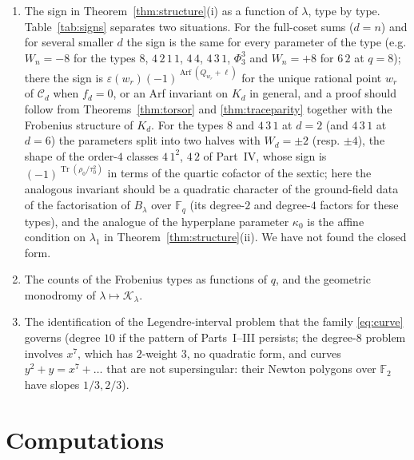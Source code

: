 \documentclass[12pt,a4paper]{amsart}
\theoremstyle{definition}
\newcommand{\F}{\mathbb{F}}
\newcommand{\Tr}{\operatorname{Tr}}
\newcommand{\Arf}{\operatorname{Arf}}
\newcommand{\eps}{\varepsilon}
\newcommand{\Kk}{\mathcal{K}}
\newcommand{\Cc}{\mathcal{C}}
\newcommand{\Fq}{\F_{q}}
\begin{document}
\begin{enumerate}[leftmargin=2em]
\item The sign in Theorem~\ref{thm:structure}(i) as a function of $\lambda$, type by type. Table~\ref{tab:signs} separates two situations. For the full-coset sums ($d=n$) and for several smaller $d$ the sign is the same for every parameter of the type (e.g. $W_n=-8$ for the types $8$, $4\,2\,1\,1$, $4\,4$, $4\,3\,1$, $\Phi_3^3$ and $W_n=+8$ for $6\,2$ at $q=8$); there the sign is $\eps(w_r)(-1)^{\Arf(Q_{w_r}+\ell)}$ for the unique rational point $w_r$ of $\Cc_d$ when $f_d=0$, or an Arf invariant on $K_d$ in general, and a proof should follow from Theorems~\ref{thm:torsor} and \ref{thm:traceparity} together with the Frobenius structure of $K_d$. For the types $8$ and $4\,3\,1$ at $d=2$ (and $4\,3\,1$ at $d=6$) the parameters split into two halves with $W_d=\pm2$ (resp. $\pm4$), the shape of the order-$4$ classes $4\,1^2$, $4\,2$ of Part~IV, whose sign is $(-1)^{\Tr(\rho_0/\tau_0^2)}$ in terms of the quartic cofactor of the sextic; here the analogous invariant should be a quadratic character of the ground-field data of the factorisation of $B_\lambda$ over $\Fq$ (its degree-$2$ and degree-$4$ factors for these types), and the analogue of the hyperplane parameter $\kappa_0$ is the affine condition on $\lambda_1$ in Theorem~\ref{thm:structure}(ii). We have not found the closed form.
\item The counts of the Frobenius types as functions of $q$, and the geometric monodromy of $\lambda\mapsto\Kk_\lambda$.
\item The identification of the Legendre-interval problem that the family \eqref{eq:curve} governs (degree $10$ if the pattern of Parts~I--III persists; the degree-$8$ problem involves $x^7$, which has $2$-weight $3$, no quadratic form, and curves $y^2+y=x^7+\dots$ that are not supersingular: their Newton polygons over $\F_2$ have slopes $1/3,2/3$).
\end{enumerate}

\section{Computations}\label{sec:comp}
\end{document}
